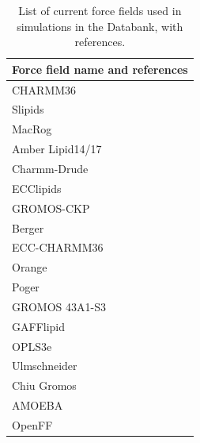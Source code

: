 \documentclass[fleqn,10pt]{wlscirepSI}
\begin{document}
\begin{table}[!h]
    \centering
    \begin{tabular}{l}
    Force field name and references \\
    \hline
    CHARMM36~\cite{klauda10}\\Slipids~\cite{jambeck12,jambeck12b,jambeck2012another,ermilova16,grote20}  \\
    MacRog~\cite{Kulig15b}  \\
    Amber Lipid14/17~\cite{dickson14,dickson22}  \\
    Charmm-Drude~\cite{li2017drude}      \\
    ECClipids~\cite{melcr18,melcr20,bacle21}  \\
    GROMOS-CKP~\cite{Chandrasekhar03,kukol09,piggot12}  \\
    Berger~\cite{berger97}  \\
    ECC-CHARMM36~\cite{nencini2019development}  \\
    Orange~\cite{catte16}  \\
    Poger~\cite{poger10}  \\
    GROMOS 43A1-S3~\cite{chiu09}  \\ 
    GAFFlipid~\cite{dickson12}  \\
    OPLS3e~\cite{roos19}  \\
    Ulmschneider~\cite{Ulmschneider09}  \\
    Chiu Gromos~\cite{chiu09}  \\
    AMOEBA~\cite{chu2018polarizable} \\
    OpenFF~\cite{mobley18,boothroyd23,OpenFFgit}
    \end{tabular}
    \caption{List of current force fields used in simulations in the Databank, with references.}
    \label{tab:ForceFields}
\end{table}
\end{document}
